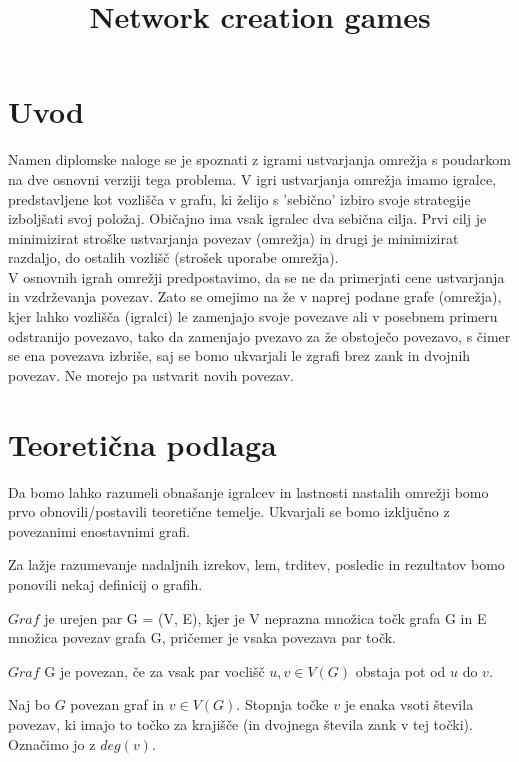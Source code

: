 \documentclass[fin1, tisk]{fmfdelo}
\title{Network creation games}
\begin{document}
\section{Uvod}

Namen diplomske naloge se je spoznati z igrami ustvarjanja omrežja s poudarkom na dve osnovni verziji tega problema.
V igri ustvarjanja omrežja imamo igralce, predstavljene kot vozlišča v grafu, ki želijo s 'sebično' izbiro svoje
strategije izboljšati svoj položaj. Običajno ima vsak igralec dva sebična cilja. Prvi cilj je minimizirat stroške
ustvarjanja povezav (omrežja) in drugi je minimizirat razdaljo, do ostalih vozlišč (strošek uporabe omrežja).\\


V osnovnih igrah omrežji predpostavimo, da se ne da primerjati cene ustvarjanja in vzdrževanja povezav. Zato se
omejimo na že v naprej podane grafe (omrežja), kjer lahko vozlišča (igralci) le zamenjajo svoje povezave ali v
posebnem primeru odstranijo povezavo, tako da zamenjajo pvezavo za že obstoječo povezavo, s čimer se ena povezava
izbriše, saj se bomo ukvarjali le zgrafi brez zank in dvojnih povezav. Ne morejo pa ustvarit novih povezav.

\section{Teoretična podlaga}
Da bomo lahko razumeli obnašanje igralcev in lastnosti nastalih omrežji bomo prvo obnovili/postavili teoretične temelje. 
Ukvarjali se bomo izključno z povezanimi enostavnimi grafi.

Za lažje razumevanje nadaljnih izrekov, lem, trditev, posledic in rezultatov bomo ponovili nekaj definicij o grafih.

\begin{definicija}
$Graf$ je urejen par G = (V, E), kjer je V neprazna množica točk grafa G in E množica povezav grafa G, pričemer je vsaka povezava par točk.
\end{definicija}

\begin{definicija}
$Graf$ G je povezan, če za vsak par voclišč $u, v \in V(G)$ obstaja pot od $u$ do $v$.
\end{definicija}

\begin{definicija}
Naj bo $G$ povezan graf in $v \in V(G)$. Stopnja točke $v$ je enaka vsoti števila povezav, ki imajo to točko za krajišče (in dvojnega števila zank v tej točki).
Označimo jo z $deg(v)$.
\end{definicija}
\end{document}
